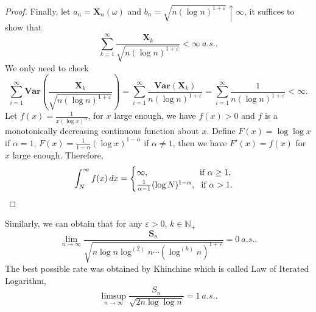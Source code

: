 \documentclass[11pt]{article}
\theoremstyle{definition}
\begin{document}
\begin{proof}
Finally, let $a_n=\mathbf{X}_n(\omega)$ and $b_n=\sqrt{n (\log n)^{1+\varepsilon}}\uparrow \infty$, it suffices to show that $$\sum^\infty_{k=1}\frac{\mathbf{X}_k}{\sqrt{n (\log n)^{1+\varepsilon}}}<\infty \ a.s..$$ We only need to check
\[
\sum^\infty_{i=1} \mathbf{Var}\left(\frac{\mathbf{X}_k}{\sqrt{n (\log n)^{1+\varepsilon}}}\right)=\sum^\infty_{i=1}\frac{\mathbf{Var}(\mathbf{X}_k)}{n (\log n)^{1+\varepsilon}}=\sum^\infty_{i=1}\frac{1}{n (\log n)^{1+\varepsilon}}<\infty.
\]
Let $f(x)=\frac{1}{x(\log x)^\alpha}$, for $x$ large enough, we have $f(x)>0$ and $f$ is a monotonically decreasing continuous function about $x$. Define $F(x)=\log\log x$ if $\alpha=1$, $F(x)=\frac{1}{1-\alpha}(\log x)^{1-\alpha}$ if $\alpha\neq 1$, then we have $F'(x)=f(x)$ for $x$ large enough. Therefore,
\[
\int^\infty_N f(x)\,dx=\begin{cases}
  \infty, \text{\quad \quad \quad\quad \quad \ \ \ if\ } \alpha\ge 1,\\ 
\frac{1}{\alpha-1}(\log N)^{1-\alpha}, \ \ \text{if\ } \alpha>1.
\end{cases}
\]
\end{proof}
\noindent Similarly, we can obtain  that for any $\varepsilon>0$, $k\in \mathbb{N}_+$
 \[ \lim_{n\rightarrow \infty}\frac{\mathbf{S}_n}{\sqrt{n\log n\log^{(2)}n\cdots (\log^{(k)} n)^{1+\varepsilon}}}=0\ a.s..
\]
The best possible rate was obtained by Khinchine which is called Law of  Iterated Logarithm,
\[
\limsup_{n\rightarrow \infty}  \frac{S_n}{{\sqrt{2n\log\log n}}}=1\ a.s..
\]
\end{document}
